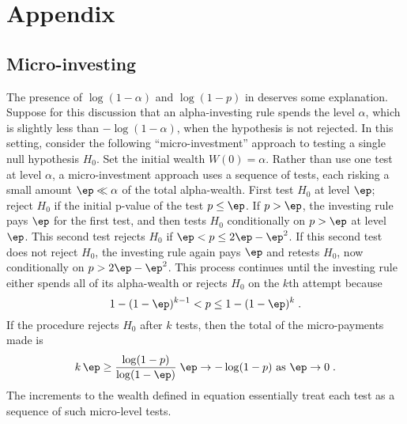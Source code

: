 \documentclass[12pt]{article}
\begin{document}
\section*{Appendix}  

\subsection*{Micro-investing}

The presence of $\log (1-\alpha)$ and $\log (1-p)$ in 
 deserves some explanation.  Suppose for this discussion that an alpha-investing rule spends the level $\alpha$, which is slightly less than $-\log(1-\alpha)$, when the hypothesis is not rejected.  In this setting, consider the following
 ``micro-investment'' approach to testing a single null hypothesis
 $H_0$.  Set the initial wealth $W(0) = \alpha$. Rather than use one test at
 level $\alpha$, a micro-investment approach uses a sequence of tests,
 each risking a small amount $\ep \ll \alpha$ of the total
 alpha-wealth.   First test $H_0$ at level $\ep$; reject $H_0$ if the initial p-value of the test $p \le \ep$.  If $p > \ep$, the investing rule pays $\ep$ for the
 first test, and then tests $H_0$ conditionally on $p > \ep$ at
 level $\ep$.  This second test rejects $H_0$ if $\ep < p \le 2\ep -
 \ep^2$.  If this second test does not reject $H_0$, the investing
 rule again pays $\ep$ and retests $H_0$, now conditionally on $p >
 2\ep - \ep^2$.  This process continues until the investing rule
 either spends all of its alpha-wealth or rejects $H_0$ on the $k$th
 attempt because
\begin{displaymath}
  1-(1-\ep)^{k-1} < p \le 1-(1-\ep)^k \;.
\end{displaymath}
If the procedure rejects $H_0$ after $k$ tests, then the total
of the micro-payments made is
\begin{displaymath}
  k \,\ep \ge \frac{\log (1-p)}{\log (1-\ep)}\; \ep
  \rightarrow -\log (1-p) \mbox{ as } \ep \rightarrow 0\;.
\end{displaymath}
The increments to the wealth defined in equation 
essentially treat each test as a sequence of such micro-level tests.
\end{document}
